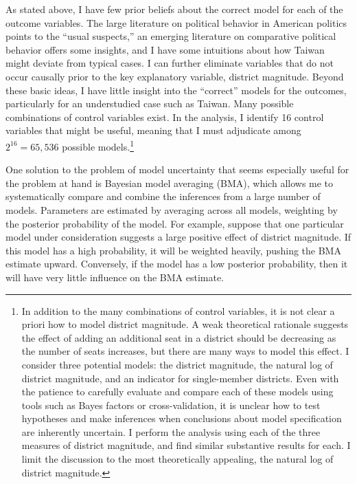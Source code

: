 \documentclass[12pt]{article}
\begin{document}
As stated above, I have few prior beliefs about the correct model for each of the outcome variables. The large literature on political behavior in American politics points to the ``usual suspects,'' an emerging literature on comparative political behavior offers some insights, and I have some intuitions about how Taiwan might deviate from typical cases. I can further eliminate variables that do not occur causally prior to the key explanatory variable, district magnitude. Beyond these basic ideas, I have little insight into the ``correct'' models for the outcomes, particularly for an understudied case such as Taiwan. Many possible combinations of control variables exist. In the analysis, I identify 16 control variables that might be useful, meaning that I must adjudicate among $2^{16} = 65,536$ possible models.\footnote{In addition to the many combinations of control variables, it is not clear a priori how to model district magnitude. A weak theoretical rationale suggests the effect of adding an additional seat in a district should be decreasing as the number of seats increases, but there are many ways to model this effect. I consider three potential models: the district magnitude, the natural log of district magnitude, and an indicator for single-member districts. Even with the patience to carefully evaluate and compare each of these models using tools such as Bayes factors or cross-validation, it is unclear how to test hypotheses and make inferences when conclusions about model specification are inherently uncertain. I perform the analysis using each of the three measures of district magnitude, and find similar substantive results for each. I limit the discussion to the most theoretically appealing, the natural log of district magnitude.}

One solution to the problem of model uncertainty that seems especially useful for the problem at hand is Bayesian model averaging (BMA), which allows me to systematically compare and combine the inferences from a large number of models. Parameters are estimated by averaging across all models, weighting by the posterior probability of the model. For example, suppose that one particular model under consideration suggests a large positive effect of district magnitude. If this model has a high probability, it will be weighted heavily, pushing the BMA estimate upward. Conversely, if the model has a low posterior probability, then it will have very little influence on the BMA estimate. 
\end{document}
